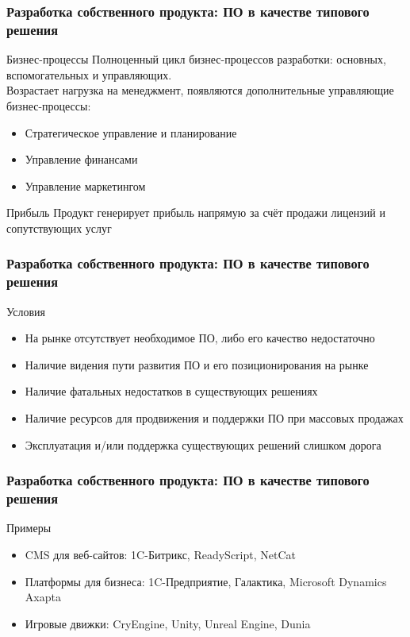 \documentclass{../industrial-development}
\begin{document}
\begin{frame} \frametitle{Разработка собственного продукта: ПО в качестве типового решения}
	\begin{block}{Бизнес-процессы}
		Полноценный цикл бизнес-процессов разработки: основных, вспомогательных и управляющих.\\
		Возрастает нагрузка на менеджмент, появляются дополнительные управляющие бизнес-процессы:
		\begin{itemize}
			\item Стратегическое управление и планирование
			\item Управление финансами
			\item Управление маркетингом
		\end{itemize}
	\end{block}
	\begin{block}{Прибыль}
		Продукт генерирует прибыль напрямую за счёт продажи лицензий и сопутствующих услуг
	\end{block}
\end{frame}
\lecturenotes


\begin{frame} \frametitle{Разработка собственного продукта: ПО в качестве типового решения}
	\begin{block}{Условия}
		\begin{itemize}
			\item На рынке отсутствует необходимое ПО, либо его качество недостаточно
			\item Наличие видения пути развития ПО и его позиционирования на рынке
			\item Наличие фатальных недостатков в существующих решениях
			\item Наличие ресурсов для продвижения и поддержки ПО при массовых продажах
			\item Эксплуатация и/или поддержка существующих решений слишком дорога
		\end{itemize}
	\end{block}
\end{frame}
\lecturenotes


\begin{frame} \frametitle{Разработка собственного продукта: ПО в качестве типового решения}
	\begin{block}{Примеры}
		\begin{itemize}
			\item CMS для веб-сайтов: 1C-Битрикс, ReadyScript, NetCat
			\item Платформы для бизнеса: 1C-Предприятие, Галактика, Microsoft Dynamics Axapta
			\item Игровые движки: CryEngine, Unity, Unreal Engine, Dunia
		\end{itemize}
	\end{block}
\end{frame}
\lecturenotes
\end{document}
